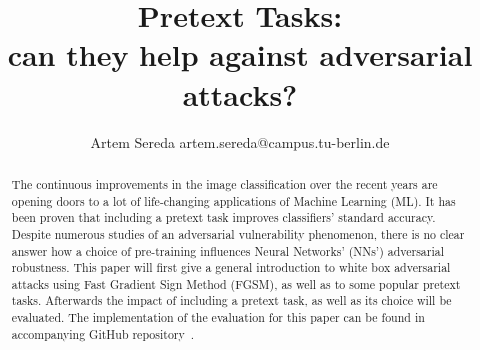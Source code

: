 \documentclass[12pt]{extarticle}
\title{
    Pretext Tasks: \\
    can they help against adversarial attacks?
}
\author{Artem Sereda artem.sereda@campus.tu-berlin.de}
\begin{document}
    \maketitle

    \begin{abstract}
    The continuous improvements in the image classification over the recent years are opening doors to
    a lot of life-changing applications of Machine Learning (ML).
    It has been proven that including a pretext task improves classifiers' standard accuracy.
    Despite numerous studies of an adversarial vulnerability phenomenon, there is no clear answer
    how a choice of pre-training influences Neural Networks' (NNs') adversarial robustness.
    This paper will first give a general introduction to white box adversarial attacks using Fast Gradient Sign Method (FGSM),
    as well as to some popular pretext tasks.
    Afterwards the impact of including a pretext task, as well as its choice will be evaluated.
    The implementation of the evaluation for this paper can be found in accompanying GitHub repository~\cite{github}.
    \end{abstract}


    
    
    
    


    \printbibliography
\end{document}
